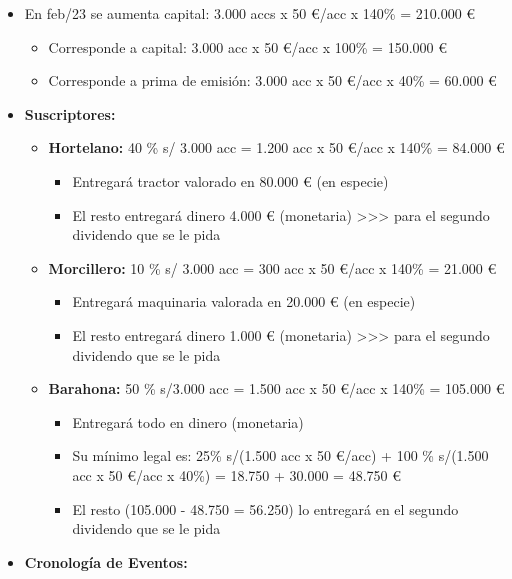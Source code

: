 \begin{itemize}
\tightlist
\item
  En feb/23 se aumenta capital: 3.000 accs x 50 €/acc x 140\% = 210.000
  €

  \begin{itemize}
  \tightlist
  \item
    Corresponde a capital: 3.000 acc x 50 €/acc x 100\% = 150.000 €
  \item
    Corresponde a prima de emisión: 3.000 acc x 50 €/acc x 40\% = 60.000
    €
  \end{itemize}
\item
  \textbf{Suscriptores:}

  \begin{itemize}
  \tightlist
  \item
    \textbf{Hortelano:} 40 \% s/ 3.000 acc = 1.200 acc x 50 €/acc x
    140\% = 84.000 €

    \begin{itemize}
    \tightlist
    \item
      Entregará tractor valorado en 80.000 € (en especie)
    \item
      El resto entregará dinero 4.000 € (monetaria)
      \textgreater\textgreater\textgreater{} para el segundo dividendo
      que se le pida
    \end{itemize}
  \item
    \textbf{Morcillero:} 10 \% s/ 3.000 acc = 300 acc x 50 €/acc x 140\%
    = 21.000 €

    \begin{itemize}
    \tightlist
    \item
      Entregará maquinaria valorada en 20.000 € (en especie)
    \item
      El resto entregará dinero 1.000 € (monetaria)
      \textgreater\textgreater\textgreater{} para el segundo dividendo
      que se le pida
    \end{itemize}
  \item
    \textbf{Barahona:} 50 \% s/3.000 acc = 1.500 acc x 50 €/acc x 140\%
    = 105.000 €

    \begin{itemize}
    \tightlist
    \item
      Entregará todo en dinero (monetaria)
    \item
      Su mínimo legal es: 25\% s/(1.500 acc x 50 €/acc) + 100 \%
      s/(1.500 acc x 50 €/acc x 40\%) = 18.750 + 30.000 = 48.750 €
    \item
      El resto (105.000 - 48.750 = 56.250) lo entregará en el segundo
      dividendo que se le pida
    \end{itemize}
  \end{itemize}
\item
  \textbf{Cronología de Eventos:}


\end{itemize}
